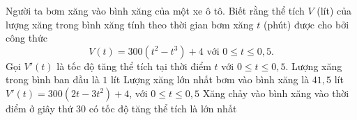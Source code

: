\begin{ex}
	Người ta bơm xăng vào bình xăng của một xe ô tô. Biết rằng thể tích $V$ (lít) của lượng xăng trong bình xăng tính theo thời gian bơm xăng $t$ (phút) được cho bởi công thức $$V(t)=300(t^2-t^3)+4 \text{ với } 0\le t\le 0{,}5.$$
Gọi $V'(t)$ là tốc độ tăng thể tích tại thời điểm $t$ với $0\le t\le 0{,}5$.
\choiceTF
{Lượng xăng trong bình ban đầu là $1$ lít}
{\True Lượng xăng lớn nhất bơm vào bình xăng là $41{,}5$ lít}
{$V'(t)=300(2t-3t^2)+4$, với $0\le t\le 0{,}5$}
{\True Xăng chảy vào bình xăng vào thời điểm ở giây thứ $30$ có tốc độ tăng thể tích là lớn nhất}
\end{ex}
